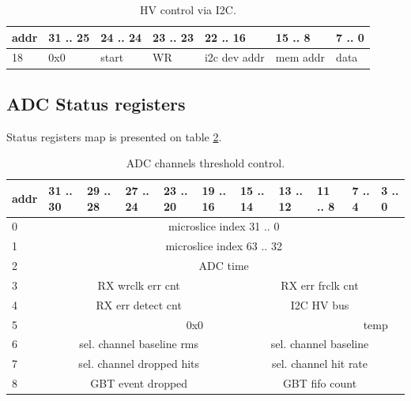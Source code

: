 \documentclass{article}
\begin{document}
\begin{table}[H]
\centering
\begin{tabular}{| l | l | l | l | l | l | l |}
\hline
addr & 31 .. 25 & 24 .. 24 & 23 .. 23 & 22 .. 16 & 15 .. 8 & 7 .. 0 \\ \hline
18 & 0x0 & start & WR & i2c dev addr & mem addr & data \\ \hline
\end{tabular}
\caption{HV control via I2C.\label{tab7}}
\end{table}


















\subsection{ADC Status registers}

Status registers map is presented on table \ref{tab8}. 

\begin{table}[H]
\centering
\begin{tabular}{| l | l | l | l | l | l | l | l | l | l | l |}
\hline
addr & 31 .. 30 & 29 .. 28 & 27 .. 24 & 23 .. 20 & 19 .. 16 & 15 .. 14 & 13 .. 12 & 11 .. 8 & 7 .. 4 & 3 .. 0 \\ \hline
0 & \multicolumn{10}{c|}{microslice index 31 .. 0}\\ \hline
1 & \multicolumn{10}{c|}{microslice index 63 .. 32}\\ \hline
2 & \multicolumn{10}{c|}{ADC time}\\ \hline
3 & \multicolumn{5}{c|}{RX wrclk err cnt} & \multicolumn{5}{c|}{RX err frclk cnt} \\ \hline
4 & \multicolumn{5}{c|}{RX err detect cnt} & \multicolumn{5}{c|}{I2C HV bus}\\ \hline
5 & \multicolumn{8}{c|}{0x0} & \multicolumn{2}{c|}{temp} \\ \hline
6 & \multicolumn{5}{c|}{sel. channel baseline rms} & \multicolumn{5}{c|}{sel. channel baseline}\\ \hline
7 & \multicolumn{5}{c|}{sel. channel dropped hits} & \multicolumn{5}{c|}{sel. channel hit rate}\\ \hline
8 & \multicolumn{5}{c|}{GBT event dropped} & \multicolumn{5}{c|}{GBT fifo count}\\ \hline
\end{tabular}
\caption{ADC channels threshold control.\label{tab8}}
\end{table}
\end{document}
